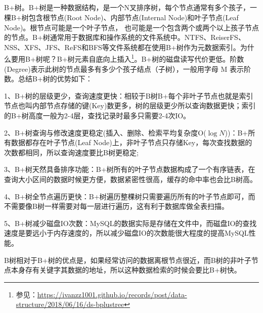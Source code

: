 \documentclass[../../../interview-questions.tex]{subfiles}
\begin{document}
\subsection{\color{red}{MySQL索引的数据结构}}

B+树。B+树是一种数据结构，是一个N叉排序树，每个节点通常有多个孩子，一棵B+树包含根节点(Root Node)、内部节点(Internal Node)和叶子节点(Leaf Node)。根节点可能是一个叶子节点， 也可能是一个包含两个或两个以上孩子节点的节点。B+树通常用于数据库和操作系统的文件系统中。NTFS、ReiserFS、NSS、XFS、JFS、ReFS和BFS等文件系统都在使用B+树作为元数据索引。为什么要用B+树呢？B+树元素自底向上插入\footnote{参见：\url{https://ivanzz1001.github.io/records/post/data-structure/2018/06/16/ds-bplustree}}。B+树的磁盘读写代价更低。阶数(Degree)表示此树的节点最多有多少个孩子结点（子树），一般用字母 M 表示阶数。总结B+树的优势如下：

1、B+树的层级更少，查询速度更快：相较于B树B+每个非叶子节点也就是索引节点也叫内部节点存储的键(Key)数更多，树的层级更少所以查询数据更快；索引的B+树高度一般为2-4层，查找记录时最多只需要2-4次IO。

2、B+树查询与修改速度更稳定(插入、删除、检索平均复杂度O($\log N$))：B+所有数据都存在叶子节点(Leaf Node)上，非叶子节点只存储Key，每次查找数据的次数都相同，所以查询速度要比B树更稳定;

3、B+树天然具备排序功能：B+树所有的叶子节点数据构成了一个有序链表，在查询大小区间的数据时候更方便，数据紧密性很高，缓存的命中率也会比B树高。

4、B+树全节点遍历更快：B+树遍历整棵树只需要遍历所有的叶子节点即可，而不需要像B树一样需要对每一层进行遍历，这有利于数据库做全表扫描。

5、B+树减少磁盘IO次数：MySQL的数据实际是存储在文件中，而磁盘IO的查找速度是要远小于内存速度的，所以减少磁盘IO的次数能很大程度的提高MySQL性能。

B树相对于B+树的优点是，如果经常访问的数据离根节点很近，而B树的非叶子节点本身存有关键字其数据的地址，所以这种数据检索的时候会要比B+树快。
\end{document}
